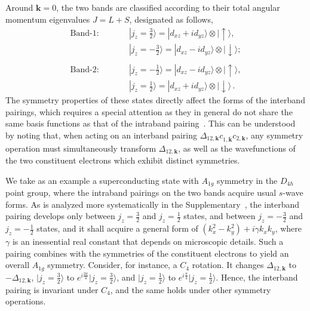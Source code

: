 \documentclass[prl,floatfix,twocolumn,showpacs,amsmath,superscriptaddress]{revtex4-2}
\newcommand{\ua}{\uparrow}
\newcommand{\da}{\downarrow}
\renewcommand{\vec}[1]{\mathbf{#1}}
\newcommand{\vk}{{\vec{k}}}
\begin{document}
Around $\vec{k}=0$, the two bands are classified according to their total angular momentum eigenvalues $J=L+S$, designated as follows,
\begin{eqnarray}
	\text{Band-1:~~~~~~}&&  |j_z=\frac{3}{2}\rangle = |d_{xz} +i d_{yz}\rangle\otimes |\ua \rangle, \nonumber \\
	&&  |j_z=-\frac{3}{2}\rangle = |d_{xz} -i d_{yz}\rangle\otimes |\da \rangle; \nonumber \\
	&& \nonumber \\
	\text{Band-2:~~~~~~}&&  |j_z=-\frac{1}{2}\rangle = |d_{xz} -i d_{yz}\rangle\otimes |\ua \rangle, \nonumber \\
	&&  |j_z=\frac{1}{2}\rangle = |d_{xz}+i d_{yz}\rangle\otimes |\da \rangle\,. \nonumber
\end{eqnarray}
The symmetry properties of these states directly affect the forms of the interband pairings, which requires a special attention as they in general do not share the same basis functions as that of the intraband pairing~\cite{Samokhin:20}. This can be understood by noting that, when acting on an interband pairing $\Delta_{12,\vec{k}}c_{1,\bar{\vec{k}}}c_{2,\vec{k}}$, any symmetry operation must simultaneously transform $\Delta_{12,\vec{k}}$, as well as the wavefunctions of the two constituent electrons which exhibit distinct symmetries. 

We take as an example a superconducting state with $A_{1g}$ symmetry in the $D_{4h}$ point group, where the intraband pairings on the two bands acquire usual $s$-wave forms. As is analyzed more systematically in the Supplementary~\cite{Supp,Huang:19}, the interband pairing develops only between $j_z=\frac{3}{2}$ and $j_z=\frac{1}{2}$ states, and between $j_z=-\frac{3}{2}$ and $j_z=-\frac{1}{2}$ states, and it shall acquire a general form of $(k^2_x-k^2_y)+i \gamma k_xk_y$, where $\gamma$ is an inessential real constant that depends on microscopic details. Such a pairing combines with the symmetries of the constituent electrons to yield an overall $A_{1g}$ symmetry. Consider, for instance, a $C_4$ rotation. It changes $\Delta_{12,\vk}$ to $-\Delta_{12,\vk}$, $|j_z=\frac{3}{2}\rangle$ to $e^{i\frac{3\pi}{4}}|j_z=\frac{3}{2}\rangle$, and $|j_z=\frac{1}{2}\rangle$ to $e^{i\frac{\pi}{4}}|j_z=\frac{1}{2}\rangle$. Hence, the interband pairing is invariant under $C_4$, and the same holds under other symmetry operations. 
\end{document}
